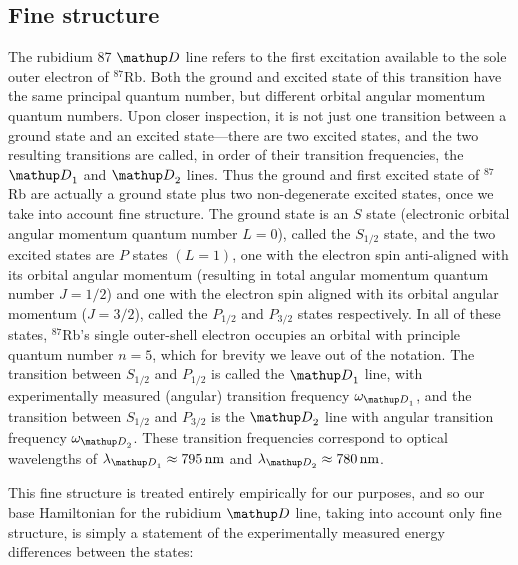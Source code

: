 \subsection{Fine structure}\label{sec:fine_structure}

The rubidium 87 $\up{D}$ line refers to the first excitation available to the sole outer electron of $^{87}$Rb. Both the ground and excited state of this transition have the same principal quantum number, but different orbital angular momentum quantum numbers. Upon closer inspection, it is not just one transition between a ground state and an excited state---there are two excited states, and the two resulting transitions are called, in order of their transition frequencies, the $\up{D}_1$ and  $\up{D}_2$ lines. Thus the ground and first excited state of $^{87}$Rb are actually a ground state plus two non-degenerate excited states, once we take into account fine structure. The ground state is an $S$ state (electronic orbital angular momentum quantum number $L=0$), called the $S_{1/2}$ state, and the two excited states are $P$ states $(L=1)$, one with the electron spin anti-aligned with its orbital angular momentum (resulting in total angular momentum quantum number $J=1/2$) and one with the electron spin aligned with its orbital angular momentum ($J=3/2$), called the $P_{1/2}$ and $P_{3/2}$ states respectively. In all of these states, $^{87}$Rb's single outer-shell electron occupies an orbital with principle quantum number $n=5$, which for brevity we leave out of the notation. The transition between $S_{1/2}$ and $P_{1/2}$ is called the $\up{D}_1$ line, with experimentally measured (angular) transition frequency $\omega_{\up{D}_1}$, and the transition between $S_{1/2}$ and $P_{3/2}$ is the $\up{D}_2$ line with angular transition frequency $\omega_{\up{D}_2}$. These transition frequencies correspond to optical wavelengths of $\lambda_{\up{D}_1} \approx 795\unit{nm}$ and $\lambda_{\up{D}_2} \approx 780\unit{nm}$\cite{steck_rubidium_2015}.

This fine structure is treated entirely empirically for our purposes, and so our base Hamiltonian for the rubidium $\up{D}$ line, taking into account only fine structure, is simply a statement of the experimentally measured energy differences between the states:

